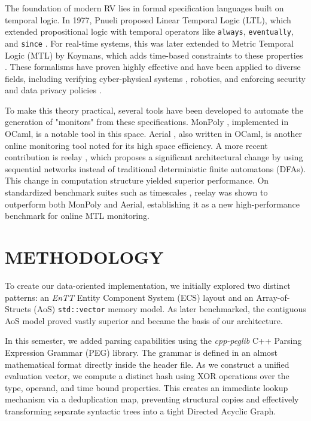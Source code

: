 \documentclass[a4paper,12pt]{report}
\begin{document}
The foundation of modern RV lies in formal specification languages built on temporal logic. In 1977, Pnueli proposed Linear Temporal Logic (LTL), which extended propositional logic with temporal operators like \texttt{always}, \texttt{eventually}, and \texttt{since} \cite{Pnueli77}. For real-time systems, this was later extended to Metric Temporal Logic (MTL) by Koymans, which adds time-based constraints to these properties \cite{Koymans90}. These formalisms have proven highly effective and have been applied to diverse fields, including verifying cyber-physical systems \cite{Cyber-Physical}, robotics, and enforcing security and data privacy policies \cite{sanchez2018jose}.

To make this theory practical, several tools have been developed to automate the generation of "monitors" from these specifications. MonPoly \cite{RV-CuBES2017:MonPoly_Monitoring_Tool}, implemented in OCaml, is a notable tool in this space. Aerial \cite{basin2017aerial}, also written in OCaml, is another online monitoring tool noted for its high space efficiency. A more recent contribution is reelay \cite{Ulus19}, which proposes a significant architectural change by using sequential networks instead of traditional deterministic finite automatons (DFAs).  This change in computation structure yielded superior performance. On standardized benchmark suites such as timescales \cite{ulus2019timescales}, reelay was shown to outperform both MonPoly and Aerial, establishing it as a new high-performance benchmark for online MTL monitoring.

\chapter{METHODOLOGY}
To create our data-oriented implementation, we initially explored two distinct patterns: an \textit{EnTT} Entity Component System (ECS) layout and an Array-of-Structs (AoS) \texttt{std::vector} memory model. As later benchmarked, the contiguous AoS model proved vastly superior and became the basis of our architecture. 

In this semester, we added parsing capabilities using the \textit{cpp-peglib} C++ Parsing Expression Grammar (PEG) library. The grammar is defined in an almost mathematical format directly inside the header file. As we construct a unified evaluation vector, we compute a distinct hash using XOR operations over the type, operand, and time bound properties. This creates an immediate lookup mechanism via a deduplication map, preventing structural copies and effectively transforming separate syntactic trees into a tight Directed Acyclic Graph.
\end{document}
